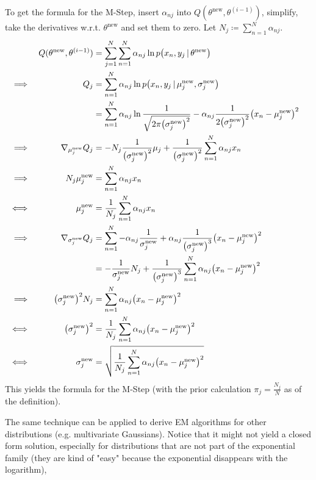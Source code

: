 					To get the formula for the M-Step, insert \( \alpha_{nj} \) into \( Q(\theta^\textrm{new}, \theta^{(i - 1)}) \), simplify, take the derivatives w.r.t. \(\theta^\textrm{new}\) and set them to zero. Let \( N_j \coloneqq \sum_{n = 1}^{N} \alpha_{nj} \).
					\begin{align}
						&& Q(\theta^\textrm{new}, \theta^{(i - 1)}) &= \sum_{j = 1}^{N} \sum_{n = 1}^{N} \alpha_{nj} \ln p\big(x_n, y_j \,\vert\, \theta^\textrm{new}\big) & \\
						\implies && Q_j &= \sum_{n = 1}^{N} \alpha_{nj} \ln p\big(x_n, y_j \,\vert\, \mu_j^\textrm{new}, \sigma_j^\textrm{new}\big) & \\
						&& &= \sum_{n = 1}^{N} \alpha_{nj} \ln \frac{1}{\sqrt{2\pi\big(\sigma_j^\textrm{new}\big)^2}} - \alpha_{nj} \frac{1}{2\big(\sigma_j^\textrm{new}\big)^2} \big(x_n - \mu_j^\textrm{new}\big)^2 & \\
						\implies && \nabla_{\mu_j^\textrm{new}} Q_j &= -N_j\frac{1}{\big(\sigma_j^\textrm{new}\big)^2}\mu_j + \frac{1}{\big(\sigma_j^\textrm{new}\big)^2} \sum_{n = 1}^{N} \alpha_{nj} x_n & \\
						\implies && N_j\mu_j^\textrm{new} &= \sum_{n = 1}^{N} \alpha_{nj} x_n & \\
						\iff && \mu_j^\textrm{new} &= \frac{1}{N_j} \sum_{n = 1}^{N} \alpha_{nj} x_n & \\
						\implies && \nabla_{\sigma_j^\textrm{new}} Q_j &= \sum_{n = 1}^{N} -\alpha_{nj} \frac{1}{\sigma_j^\textrm{new}} + \alpha_{nj} \frac{1}{\big(\sigma_j^\textrm{new}\big)^3} \big(x_n - \mu_j^\textrm{new}\big)^2 & \\
						&& &= -\frac{1}{\sigma_j^\textrm{new}} N_j + \frac{1}{\big(\sigma_j^\textrm{new}\big)^3} \sum_{n = 1}^{N} \alpha_{nj} \big(x_n - \mu_j^\textrm{new}\big)^2 & \\
						\implies && \big(\sigma_j^\textrm{new}\big)^2 N_j &= \sum_{n = 1}^{N} \alpha_{nj} \big(x_n - \mu_j^\textrm{new}\big)^2 & \\
						\iff && \big(\sigma_j^\textrm{new}\big)^2 &= \frac{1}{N_j} \sum_{n = 1}^{N} \alpha_{nj} \big(x_n - \mu_j^\textrm{new}\big)^2 & \\
						\iff && \sigma_j^\textrm{new} &= \sqrt{\frac{1}{N_j} \sum_{n = 1}^{N} \alpha_{nj} \big(x_n - \mu_j^\textrm{new}\big)^2}
					\end{align}
					This yields the formula for the M-Step (with the prior calculation \( \pi_j = \frac{N_j}{N} \) as of the definition).

					The same technique can be applied to derive EM algorithms for other distributions (e.g. multivariate Gaussians). Notice that it might not yield a closed form solution, especially for distributions that are not part of the exponential family (they are kind of "easy" because the exponential disappears with the logarithm),

